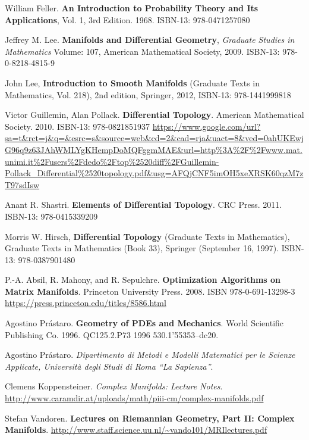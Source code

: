 \documentclass[10pt]{amsart}
\begin{document}
\begin{thebibliography}{9}

William Feller.  \textbf{An Introduction to Probability Theory and Its Applications}, Vol. 1, 3rd Edition.  1968.  ISBN-13: 978-0471257080



Jeffrey M. Lee. \textbf{Manifolds and Differential Geometry}, \emph{Graduate Studies in Mathematics} Volume: 107, American Mathematical Society, 2009. ISBN-13: 978-0-8218-4815-9

John Lee, \textbf{Introduction to Smooth Manifolds} (Graduate Texts in Mathematics, Vol. 218), 2nd edition, Springer,  2012, ISBN-13: 978-1441999818

Victor Guillemin, Alan Pollack. \textbf{Differential Topology}. American Mathematical Society. 2010. ISBN-13: 978-0821851937
\url{https://www.google.com/url?sa=t&rct=j&q=&esrc=s&source=web&cd=2&cad=rja&uact=8&ved=0ahUKEwjG96q9z63JAhWMLYgKHempDoMQFggmMAE&url=http\%3A\%2F\%2Fwww.mat.unimi.it\%2Fusers\%2Fdedo\%2Ftop\%2520diff\%2FGuillemin-Pollack_Differential\%2520topology.pdf&usg=AFQjCNF5imOH5xeXRSK60qzM7zT97sdIsw}

Anant R. Shastri. \textbf{Elements of Differential Topology}. CRC Press. 2011. ISBN-13: 978-0415339209

Morris W. Hirsch, \textbf{Differential Topology} (Graduate Texts in Mathematics), Graduate Texts in Mathematics (Book 33), Springer (September 16, 1997). ISBN-13: 978-0387901480

P.-A. Absil, R. Mahony, and R. Sepulchre.  \textbf{Optimization Algorithms on Matrix Manifolds}.  Princeton University Press.  2008.  ISBN 978-0-691-13298-3
\url{https://press.princeton.edu/titles/8586.html}  


Agostino Pr\'{a}staro.  \textbf{Geometry of PDEs and Mechanics}.  World Scientific Publishing Co.  1996.  QC125.2.P73 1996  530.1'55353--dc20.  

Agostino Pr\'{a}staro.  \emph{Dipartimento di Metodi e Modelli Matematici per le Scienze Applicate, Universit\`{a} degli Studi di Roma ``La Sapienza''}.  

  Clemens Koppensteiner.  \emph{Complex Manifolds: Lecture Notes}.  \url{http://www.caramdir.at/uploads/math/piii-cm/complex-manifolds.pdf}
  

Stefan Vandoren. \textbf{Lectures on Riemannian Geometry, Part II: Complex Manifolds}.  \url{http://www.staff.science.uu.nl/~vando101/MRIlectures.pdf} 


\end{thebibliography}
\end{document}
